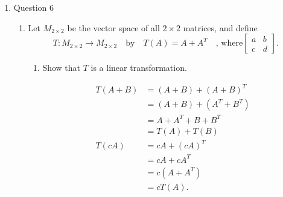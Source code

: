 \documentclass{zc-ust-hw}
\begin{document}
\begin{enumerate}
    \newpage

  \item Question 6
    \begin{enumerate}
      \item Let $M_{2\times 2}$ be the vector space of all $2\times 2$ matrices, and define
        \[
          T: M_{2\times 2} \to M_{2\times 2} \quad \text{by} \quad T(A) = A+A^T \quad \text{, where} \begin{bmatrix} a&b\\c&d \end{bmatrix} 
        .\] 
        \begin{enumerate}
          \item Show that $T$ is a linear transformation.
            \begin{sol}
              \begin{align}
                T(A+B) &= (A+B) + (A+B)^T \\
                       &= (A+B) + (A^T + B^T) \\
                       &= A + A^T + B + B^T \\
                       &= T(A) + T(B) \\
                T(cA) &= cA + (cA)^T \\
                      &= cA + cA^T \\
                      &= c(A + A^T) \\
                      &= cT(A)
              .\end{align}
            \end{sol}


\end{enumerate}
\end{enumerate}
\end{enumerate}
\end{document}
